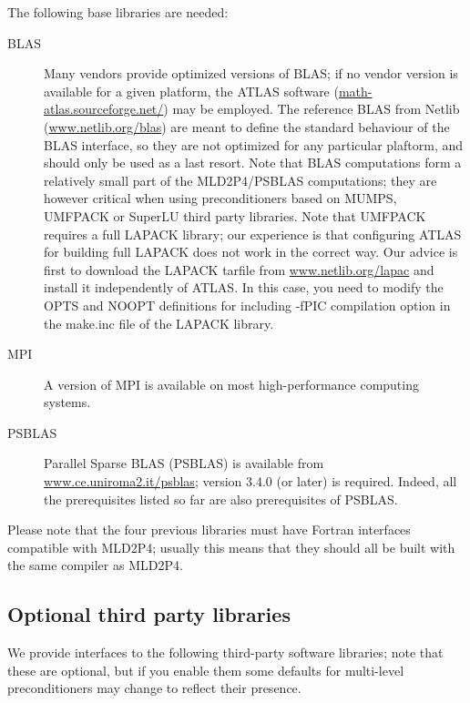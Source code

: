 The following base libraries are needed: 
\begin{description}
\item[BLAS] \cite{blas3,blas2,blas1} Many vendors provide optimized versions
  of BLAS; if no vendor version is
  available for a given platform, the ATLAS software
  (\url{math-atlas.sourceforge.net/})
  may be employed.  The reference BLAS from Netlib
  (\url{www.netlib.org/blas}) are meant to define the standard
  behaviour of the BLAS interface, so they are not optimized for any
  particular plaftorm, and should only be used as a last
  resort. Note that BLAS computations form a relatively small part of
  the MLD2P4/PSBLAS computations; they are however critical when using
  preconditioners based on MUMPS, UMFPACK or SuperLU third party
  libraries. Note that UMFPACK requires a full LAPACK library; our
experience is that configuring ATLAS for building full LAPACK does not
work in the correct way. Our advice is first to download the LAPACK tarfile from
\url{www.netlib.org/lapac} and install it independently of ATLAS. In this case,
you need to modify the OPTS and NOOPT definitions for including -fPIC compilation option
in the make.inc file of the LAPACK library. 
\item[MPI] \cite{MPI2,MPI1} A version of MPI is available on most
  high-performance computing systems.
 \item[PSBLAS] \cite{PSBLASGUIDE,psblas_00} Parallel Sparse BLAS (PSBLAS) is
  available from \url{www.ce.uniroma2.it/psblas}; version
  3.4.0  (or later) is required. Indeed, all the prerequisites
  listed so far are also prerequisites of PSBLAS.
\end{description}
Please note that the four previous libraries must have Fortran
interfaces compatible with MLD2P4;
usually this means that they should all be built with the same
compiler as MLD2P4.

\subsection{Optional third party libraries}

We provide interfaces to the following third-party software libraries;
note that these are optional, but if you enable them some defaults
for multi-level preconditioners may change to reflect their presence. 

